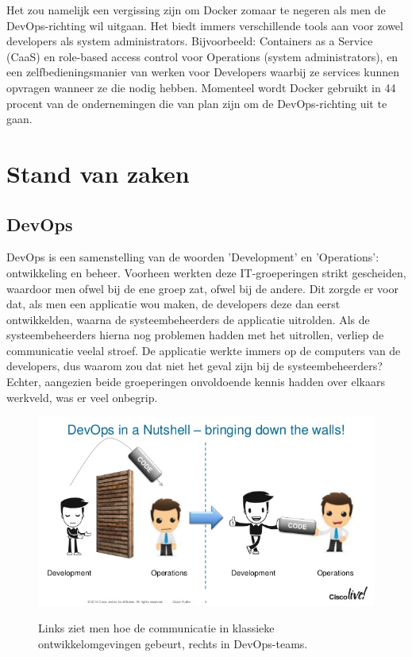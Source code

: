 Het zou namelijk een vergissing zijn om Docker zomaar te negeren als men de DevOps-richting wil uitgaan. Het biedt immers verschillende tools aan voor zowel developers als system administrators. Bijvoorbeeld: Containers as a Service (CaaS) en role-based access control voor Operations (system administrators), en een zelfbedieningsmanier van werken voor Developers waarbij ze services kunnen opvragen wanneer ze die nodig hebben. Momenteel wordt Docker gebruikt in 44 procent van de ondernemingen die van plan zijn om de DevOps-richting uit te gaan. \autocite{Christopher2017}

\section{Stand van zaken}
\label{sec:stand-van-zaken}

\subsection{DevOps}
\label{sec:devops-uitleg}
DevOps is een samenstelling van de woorden ’Development’ en ’Operations’: ontwikkeling en beheer. Voorheen werkten deze IT-groeperingen strikt gescheiden, waardoor men ofwel bij de ene groep zat, ofwel bij de andere. Dit zorgde er voor dat, als men een applicatie wou maken, de developers deze dan eerst ontwikkelden, waarna de systeembeheerders de applicatie uitrolden. Als de systeembeheerders hierna nog problemen hadden met het uitrollen, verliep de communicatie veelal stroef. De applicatie werkte immers op de computers van de developers, dus waarom zou dat niet het geval zijn bij de systeembeheerders? Echter, aangezien beide groeperingen onvoldoende kennis hadden over elkaars werkveld, was er veel onbegrip. 

\begin{figure}
	\centering
	\caption{Links ziet men hoe de communicatie in klassieke ontwikkelomgevingen gebeurt, rechts in DevOps-teams.}
	\includegraphics[scale=0.6]{img/devopsmuur.jpg}
	\label{fig:devopsmuren}
\end{figure}

